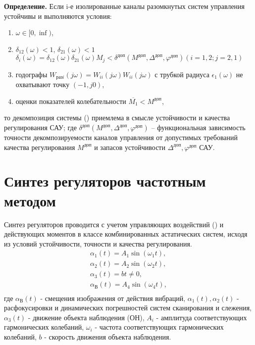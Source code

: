 \textbf{Определение.}
 Если i-е изолированные каналы разомкнутых систем управления устойчивы и выполняются условия: 
\begin{enumerate}
	\item $\omega \in [0,\inf)$,
	\item $\delta{}_{12}\left(\omega{}\right)<1$, 
	$\delta{}_{21}\left(\omega{}\right)<1$
	${\delta{}}_i(\omega{})={\delta{}}_{12}(\omega{}){\delta{}}_{21}(\omega{})M_j<\delta^{\textit{доп}}(M^{\textit{доп}}, \varDelta^{\textit{доп}}, \varphi^{\textit{доп}}) (i=1,2; j=2,1)$
	\item годографы 
	$W_{\textit{разi}}(j\omega{})=W_{ii}(j\omega{})W_{ii}(j\omega{})$ с трубкой радиуса 
	${\epsilon{}}_1\left(\omega{}\right)$ не охватывают точку $(-1,j0)$,
	\item оценки показателей колебательности $\overline{M_1}<M^{\textit{доп}}$,
\end{enumerate}
то декомпозиция системы () приемлема в смысле устойчивости и качества регулирования САУ; где
$\delta^{\textit{доп}}(M^{\textit{доп}}, \varDelta^{\textit{доп}}, \varphi^{\textit{доп}})$
 – функциональная зависимость точности декомпозируемости каналов управления от допустимых требований качества регулирования $M^{\textit{доп}}$ и запасов устойчивости $\varDelta^{\textit{доп}}, \varphi^{\textit{доп}}$ САУ. 
 
 
\section{Синтез регуляторов частотным методом} \label{sec:ch2/sec6}


Синтез регуляторов проводится с учетом управляющих воздействий () и действующих моментов в классе комбинированных астатических систем, исходя из условий устойчивости, точности и качества регулирования. 
\begin{equation}
\label{eq:p2:3-a2}
\begin{alignedat}{2}
\alpha_1(t) = A_1\sin(\omega_1t) ,\\
\alpha_2(t) = A_2\sin(\omega_2t) ,\\
\alpha_3(t) = bt \neq 0,\\
\alpha_{\textit{В}}(t) = A_4\sin(\omega_4t) ,\\
\end{alignedat}
\end{equation}
где $\alpha_{\textit{В}}(t)$ - смещения изображения от действия вибраций,
$\alpha_1(t), \alpha_2(t)$ - расфокусировки и динамических погрешностей систем сканирования и слежения,
$\alpha_3(t)$ - движение объекта наблюдения (ОН), 
$A_i$ - амплитуда соответствующих гармонических колебаний,
$\omega_i$ - частота соответствующих гармонических колебаний,
$b$ - скорость движения объекта наблюдения.

